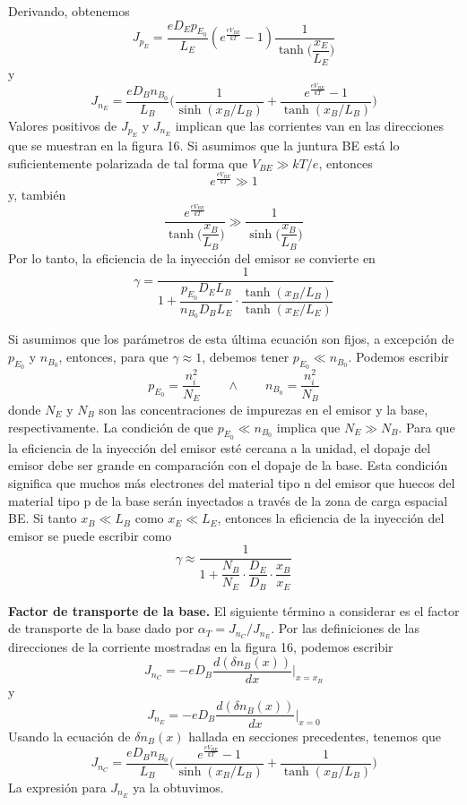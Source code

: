 \documentclass[12pt,a4paper]{article}
\begin{document}
Derivando, obtenemos
\[ J_{p_{E}}=\frac{eD_{E}p_{E_{0}}}{L_{E}} (e^{\frac{eV_{BE}}{kT}}-1) \frac{1}{\tanh \bigg( \dfrac{x_{E}}{L_{E}} \bigg)} \]
y
\[ J_{n_{E}}=\frac{eD_{B}n_{B_{0}}}{L_{B}} \bigg( \frac{1}{\sinh(x_{B}/L_{B})} + \frac{e^{\frac{eV_{BE}}{kT}}-1}{\tanh (x_{B}/L_{B})}\bigg) \]
Valores positivos de $J_{p_{E}}$ y $J_{n_{E}}$ implican que las corrientes van en las direcciones que se muestran en la figura 16. Si asumimos que la juntura BE está lo suficientemente polarizada de tal forma que $V_{BE}\gg kT/e$, entonces
\[ e^{\frac{eV_{BE}}{kT}} \gg 1 \]
y, también
\[ \frac{e^{\frac{eV_{BE}}{kT}}}{\tanh \bigg( \dfrac{x_{B}}{L_{B}} \bigg)} \gg \frac{1}{\sinh \bigg( \dfrac{x_{B}}{L_{B}} \bigg)} \]
Por lo tanto, la eficiencia de la inyección del emisor se convierte en
\[ \gamma = \frac{1}{1+\dfrac{p_{E_{0}}D_{E}L_{B}}{n_{B_{0}}D_{B}L_{E}} \cdot \dfrac{\tanh (x_{B}/L_{B})}{\tanh (x_{E}/L_{E})}} \]

Si asumimos que los parámetros de esta última ecuación son fijos, a excepción de $p_{E_{0}}$ y $n_{B_{0}}$, entonces, para que $\gamma \approx 1$, debemos tener $p_{E_{0}} \ll n_{B_{0}}$. Podemos escribir
\[ p_{E_{0}}=\frac{n_{i}^{2}}{N_{E}} \qquad \wedge \qquad n_{B_{0}}=\frac{n_{i}^{2}}{N_{B}} \]
donde $N_{E}$ y $N_{B}$ son las concentraciones de impurezas en el emisor y la base, respectivamente. La condición de que $p_{E_{0}} \ll n_{B_{0}}$ implica que $N_{E} \gg N_{B}$. Para que la eficiencia de la inyección del emisor esté cercana a la unidad, el dopaje del emisor debe ser grande en comparación con el dopaje de la base. Esta condición significa que muchos más electrones del material tipo n del emisor que huecos del material tipo p de la base serán inyectados a través de la zona de carga espacial BE. Si tanto $x_{B} \ll L_{B}$ como $x_{E} \ll L_{E}$, entonces la eficiencia de la inyección del emisor se puede escribir como
\[ \gamma \approx \frac{1}{1+\dfrac{N_{B}}{N_{E}} \cdot \dfrac{D_{E}}{D_{B}} \cdot \dfrac{x_{B}}{x_{E}}} \]

\textbf{Factor de transporte de la base.} El siguiente término a considerar es el factor de transporte de la base dado por $\alpha _{T}=J_{n_{C}}/J_{n_{E}}$. Por las definiciones de las direcciones de la corriente mostradas en la figura 16, podemos escribir
\[ J_{n_{C}}=-eD_{B}\frac{d(\delta n_{B}(x))}{dx} |_{x=x_{B}} \]
y
\[ J_{n_{E}}=-eD_{B} \frac{d(\delta n_{B}(x))}{dx} |_{x=0} \]
Usando la ecuación de $\delta n_{B}(x)$ hallada en secciones precedentes, tenemos que
\[ J_{n_{C}}=\frac{eD_{B}n_{B_{0}}}{L_{B}} \bigg( \frac{e^{\frac{eV_{BE}}{kT}}-1}{\sinh(x_{B}/L_{B})} + \frac{1}{\tanh(x_{B}/L_{B})} \bigg) \]
La expresión para $J_{n_{E}}$ ya la obtuvimos.
\end{document}
